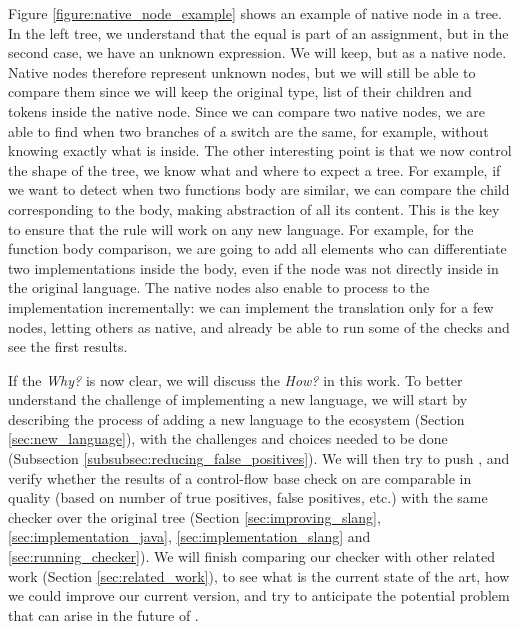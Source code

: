 Figure \ref{figure:native_node_example} shows an example of native node in a \slang{} tree. 
In the left tree, we understand that the equal is part of an assignment, but in the second case, we have an unknown expression. 
We will keep, but as a native node.
Native nodes therefore represent unknown nodes, but we will still be able to compare them since we will keep the original type, list of their children and tokens inside the native node. 
Since we can compare two native nodes, we are able to find when two branches of a switch are the same, for example, without knowing exactly what is inside.
The other interesting point is that we now control the shape of the tree, we know what and where to expect a tree. 
For example, if we want to detect when two functions body are similar, we can compare the child corresponding to the body, making abstraction of all its content.
This is the key to ensure that the rule will work on any new language.
For example, for the function body comparison, we are going to add all elements who can differentiate two implementations inside the body, even if the node was not directly inside in the original language.
The native nodes also enable to process to the implementation incrementally: we can implement the translation only for a few nodes, letting others as native, and already be able to run some of the checks and see the first results.


If the \emph{Why?} is now clear, we will discuss the \emph{How?} in this work. 
To better understand the challenge of implementing a new language, we will start by describing the process of adding a new language to the ecosystem (Section \ref{sec:new_language}), with the challenges and choices needed to be done (Subsection \ref{subsubsec:reducing_false_positives}). 
We will then try to push \slang{}, and verify whether the results of a control-flow base check on \slang{} are comparable in quality (based on number of true positives, false positives, etc.) with the same checker over the original tree (Section \ref{sec:improving_slang}, \ref{sec:implementation_java}, \ref{sec:implementation_slang} and \ref{sec:running_checker}).
We will finish comparing our checker with other related work (Section \ref{sec:related_work}), to see what is the current state of the art, how we could improve our current version, and try to anticipate the potential problem that can arise in the future of \slang{}.




